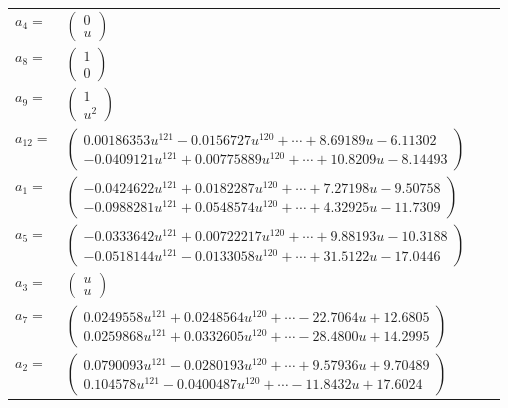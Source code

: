 \documentclass[1p]{elsarticle_modified}
\theoremstyle{definition}
\begin{document}
\begin{tabular}{m{7pt} m{180pt} m{7pt} m{180pt} }
\flushright $a_{4}=$&$\begin{pmatrix}0\\u\end{pmatrix}$ \\
\flushright $a_{8}=$&$\begin{pmatrix}1\\0\end{pmatrix}$ \\
\flushright $a_{9}=$&$\begin{pmatrix}1\\u^2\end{pmatrix}$ \\
\flushright $a_{12}=$&$\begin{pmatrix}0.00186353 u^{121}-0.0156727 u^{120}+\cdots+8.69189 u-6.11302\\-0.0409121 u^{121}+0.00775889 u^{120}+\cdots+10.8209 u-8.14493\end{pmatrix}$ \\
\flushright $a_{1}=$&$\begin{pmatrix}-0.0424622 u^{121}+0.0182287 u^{120}+\cdots+7.27198 u-9.50758\\-0.0988281 u^{121}+0.0548574 u^{120}+\cdots+4.32925 u-11.7309\end{pmatrix}$ \\
\flushright $a_{5}=$&$\begin{pmatrix}-0.0333642 u^{121}+0.00722217 u^{120}+\cdots+9.88193 u-10.3188\\-0.0518144 u^{121}-0.0133058 u^{120}+\cdots+31.5122 u-17.0446\end{pmatrix}$ \\
\flushright $a_{3}=$&$\begin{pmatrix}u\\u\end{pmatrix}$ \\
\flushright $a_{7}=$&$\begin{pmatrix}0.0249558 u^{121}+0.0248564 u^{120}+\cdots-22.7064 u+12.6805\\0.0259868 u^{121}+0.0332605 u^{120}+\cdots-28.4800 u+14.2995\end{pmatrix}$ \\
\flushright $a_{2}=$&$\begin{pmatrix}0.0790093 u^{121}-0.0280193 u^{120}+\cdots+9.57936 u+9.70489\\0.104578 u^{121}-0.0400487 u^{120}+\cdots-11.8432 u+17.6024\end{pmatrix}$ \\

\end{tabular}
\end{document}
